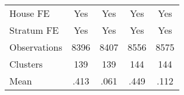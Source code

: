 {\begin{tabular}{l*{4}{c}}
House FE        &      Yes         &      Yes         &      Yes         &      Yes         \\
Stratum FE      &      Yes         &      Yes         &      Yes         &      Yes         \\
\hline
Observations    &     8396         &     8407         &     8556         &     8575         \\
Clusters        &      139         &      139         &      144         &      144         \\
Mean            &     .413         &     .061         &     .449         &     .112         \\
\hline\hline
\end{tabular}
}
